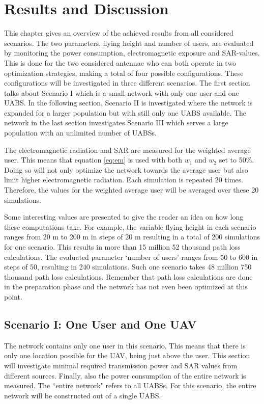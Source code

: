 \chapter{Results and Discussion}
\label{chap:results}

This chapter gives an overview of the achieved results from all considered scenarios. The two parameters,
flying height and number of users, are evaluated by monitoring the power consumption, electromagnetic exposure and \gls{SAR}-values.
This is done for the two considered antennae who can both operate in two optimization strategies, making a total of four possible configurations.
These configurations will be investigated in three different scenarios.
The first section talks about Scenario I which is a small network with only one user and one \gls{UABS}. In 
the following section, Scenario II is investigated where the network is expanded for a larger population 
but with still only one \gls{UABS} available.
The network in the last section investigates Scenario III which serves a large population with an unlimited number of \gls{UABS}s.

The electromagnetic radiation and \gls{SAR} are 
measured for the weighted average user. This means that 
equation \ref{eq:em} is used with both $w_{1}$ and $w_{2}$ set to 50\%. Doing so will not only optimize the network 
towards the average user but also limit higher electromagnetic radiation. Each simulation is repeated 20 times. 
Therefore, the values for the weighted average user will be averaged over these 20 simulations.

Some interesting values are presented to give the reader an idea on how long these computations take.
For example, the variable flying height in each scenario ranges from 
20 m to 200 m in steps of 20 m resulting in a total of 200 simulations for one scenario. 
This results in more than 15 million 52 thousand path loss calculations.
The evaluated parameter  `number of users'
ranges from 50 to 600 in steps of 50, resulting 
in 240 simulations. Such one scenario takes 48 million 750 thousand path loss calculations. Remember that path loss calculations
are done in the preparation phase and the network has not even been optimized at this point.

\section{Scenario I: One User and One \gls{UAV}}
The network contains only one user in this scenario. This means that there is only one location possible for the \gls{UAV},
being just above 
the user. This section will investigate minimal required transmission power and SAR values from different sources.
Finally, also the power consumption of the entire network is measured. The  ``entire network" refers to all \gls{UABS}s. 
For this scenario, the entire network 
will be constructed out of a single \gls{UABS}.

